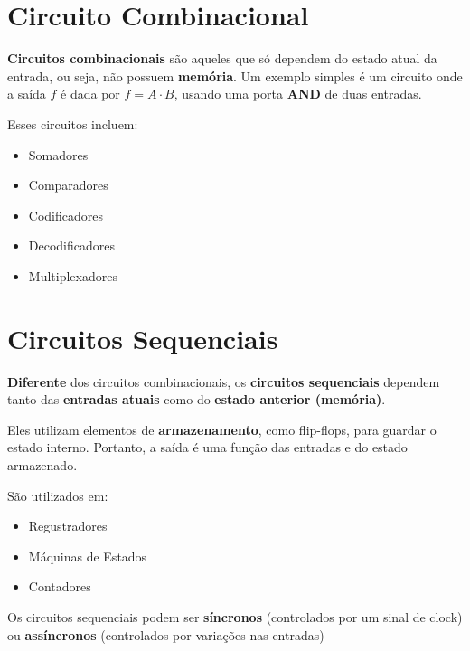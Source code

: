\documentclass[12pt]{article}
\begin{document}
\section{Circuito Combinacional}

\textbf{Circuitos combinacionais} são aqueles que só dependem do estado atual da entrada, ou seja, não possuem \textbf{memória}.
Um exemplo simples é um circuito onde a saída $f$ é dada por $f = A \cdot B$, usando uma porta \textbf{AND} de duas entradas.

\vspace{0.5cm}

Esses circuitos incluem:

\begin{itemize}
   \item Somadores
   \item Comparadores
   \item Codificadores
   \item Decodificadores
   \item Multiplexadores
\end{itemize}

\section{Circuitos Sequenciais}

\textbf{Diferente} dos circuitos combinacionais, os \textbf{circuitos sequenciais} dependem tanto das \textbf{entradas atuais} como do \textbf{estado anterior (memória)}.

Eles utilizam elementos de \textbf{armazenamento}, como flip-flops, para guardar o estado interno. Portanto, a saída é uma função das entradas e do estado armazenado. 

\vspace{0.5cm}

São utilizados em:

\begin{itemize}
   \item Regustradores
   \item Máquinas de Estados
   \item Contadores
\end{itemize}

\vspace{0.5cm}

Os circuitos sequenciais podem ser \textbf{síncronos} (controlados por um sinal de clock) ou \textbf{assíncronos} (controlados por variações nas entradas)
\end{document}
